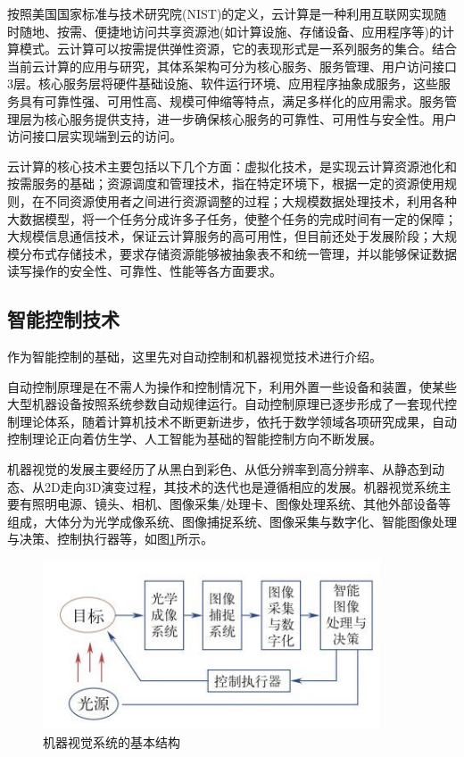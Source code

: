 \documentclass[lang=cn,12pt,bibtex,newtx,twoside,margintrue,citestyle=gb7714-2015, bibstyle=gb7714-2015]{elegantbook}
\begin{document}
按照美国国家标准与技术研究院(NIST)的定义，云计算是一种利用互联网实现随时随地、按需、便捷地访问共享资源池(如计算设施、存储设备、应用程序等)的计算模式。云计算可以按需提供弹性资源，它的表现形式是一系列服务的集合。结合当前云计算的应用与研究，其体系架构可分为核心服务、服务管理、用户访问接口3层。核心服务层将硬件基础设施、软件运行环境、应用程序抽象成服务，这些服务具有可靠性强、可用性高、规模可伸缩等特点，满足多样化的应用需求。服务管理层为核心服务提供支持，进一步确保核心服务的可靠性、可用性与安全性。用户访问接口层实现端到云的访问。

云计算的核心技术主要包括以下几个方面：虚拟化技术，是实现云计算资源池化和按需服务的基础；资源调度和管理技术，指在特定环境下，根据一定的资源使用规则，在不同资源使用者之间进行资源调整的过程；大规模数据处理技术，利用各种大数据模型，将一个任务分成许多子任务，使整个任务的完成时间有一定的保障；大规模信息通信技术，保证云计算服务的高可用性，但目前还处于发展阶段；大规模分布式存储技术，要求存储资源能够被抽象表不和统一管理，并以能够保证数据读写操作的安全性、可靠性、性能等各方面要求。

\subsection{智能控制技术}
\label{sec:orgbdfe0e5}
作为智能控制的基础，这里先对自动控制和机器视觉技术进行介绍。

自动控制原理是在不需人为操作和控制情况下，利用外置一些设备和装置，使某些大型机器设备按照系统参数自动规律运行\cite{黄慧媛2019}。自动控制原理已逐步形成了一套现代控制理论体系，随着计算机技术不断更新进步，依托于数学领域各项研究成果，自动控制理论正向着仿生学、人工智能为基础的智能控制方向不断发展\cite{蔡杰2018}。

机器视觉的发展主要经历了从黑白到彩色、从低分辨率到高分辨率、从静态到动态、从2D走向3D演变过程，其技术的迭代也是遵循相应的发展。机器视觉系统主要有照明电源、镜头、相机、图像采集/处理卡、图像处理系统、其他外部设备等组成，大体分为光学成像系统、图像捕捉系统、图像采集与数字化、智能图像处理与决策、控制执行器等，如图\ref{2.3}所示。

\begin{figure}[htbp]
\centering
\includegraphics[angle=0,width=10cm]{./figure/2.3.jpg}
\caption{\label{2.3}机器视觉系统的基本结构}
\end{figure}
\end{document}
